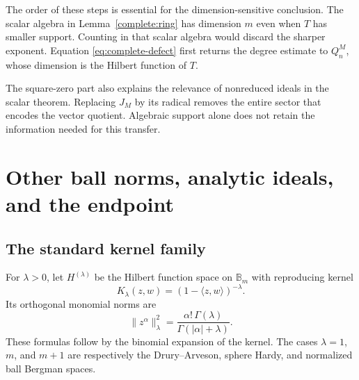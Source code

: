 \documentclass[11pt,reqno]{amsart}
\numberwithin{equation}{section}
\theoremstyle{definition}
\theoremstyle{remark}
\begin{document}
The order of these steps is essential for the dimension-sensitive
conclusion.  The scalar algebra in Lemma~\ref{complete:ring} has
dimension $m$ even when $T$ has smaller support.  Counting in that
scalar algebra would discard the sharper exponent.  Equation
\eqref{eq:complete-defect} first returns the degree estimate to
$Q_n^M$, whose dimension is the Hilbert function of $T$.

The square-zero part also explains the relevance of nonreduced ideals
in the scalar theorem.  Replacing $J_M$ by its radical removes the
entire sector that encodes the vector quotient.  Algebraic support
alone does not retain the information needed for this transfer.



\section{Other ball norms, analytic ideals, and the endpoint}
\label{sec:extensions}

\subsection{The standard kernel family}
For $\lambda>0$, let $H^{(\lambda)}$ be the Hilbert function space on
$\mathbb B_m$ with reproducing kernel
\[
 K_\lambda(z,w)=(1-\langle z,w\rangle)^{-\lambda}.
\]
Its orthogonal monomial norms are
\begin{equation}\label{eq:ext-norm}
 \|z^\alpha\|_\lambda^2
 =\frac{\alpha!\,\Gamma(\lambda)}{\Gamma(|\alpha|+\lambda)}.
\end{equation}
These formulas follow by the binomial expansion of the kernel.  The
cases $\lambda=1$, $m$, and $m+1$ are respectively the
Drury--Arveson, sphere Hardy, and normalized ball Bergman spaces.
\end{document}

